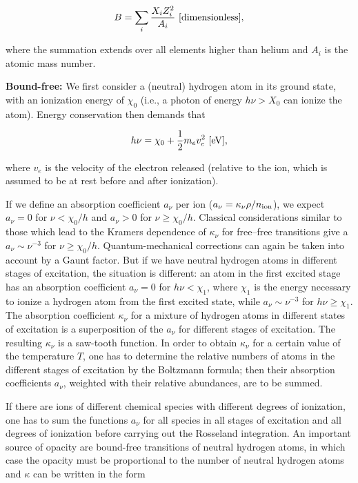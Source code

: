 \documentclass[a4paper,10pt]{article}
\begin{document}
\begin{align*}
    B = \sum_i \frac{X_iZ_i^2}{A_i} ~ [{\rm dimensionless}],
\end{align*}

{\noindent}where the summation extends over all elements higher than helium and $A_i$ is the atomic mass number.

{\noindent}\textbf{Bound-free:} We first consider a (neutral) hydrogen atom in its ground state, with an ionization energy of $\chi_0$ (i.e., a photon of energy $h\nu>X_0$ can ionize the atom). Energy conservation then demands that 

\begin{align*}
    h\nu = \chi_0 + \frac{1}{2}m_ev_e^2 ~ [{\rm eV}],
\end{align*}

{\noindent}where $v_e$ is the velocity of the electron released (relative to the ion, which is assumed to be at rest before and after ionization). 

{\noindent}If we define an absorption coefficient $a_\nu$ per ion ($a_\nu=\kappa_\nu\rho/n_{\rm ion}$), we expect $a_\nu=0$ for $\nu<\chi_0/h$ and $a_\nu>0$ for $\nu\geq\chi_0/h$. Classical considerations similar to those which lead to the Kramers dependence of $\kappa_\nu$ for free–free transitions give a $a_\nu\sim\nu^{-3}$ for $\nu\geq\chi_0/h$. Quantum-mechanical corrections can again be taken into account by a Gaunt factor. But if we have neutral hydrogen atoms in different stages of excitation, the situation is different: an atom in the first excited stage has an absorption coefficient $a_\nu=0$ for $h\nu<\chi_1$, where $\chi_1$ is the energy necessary to ionize a hydrogen atom from the first excited state, while $a_\nu\sim\nu^{-3}$ for $h\nu\geq\chi_1$. The absorption coefficient $\kappa_\nu$ for a mixture of hydrogen atoms in different states of excitation is a superposition of the $a_\nu$ for different stages of excitation. The resulting $\kappa_\nu$ is a saw-tooth function. In order to obtain $\kappa_\nu$ for a certain value of the temperature $T$, one has to determine the relative numbers of atoms in the different stages of excitation by the Boltzmann formula; then their absorption coefficients $a_\nu$, weighted with their relative abundances, are to be summed.

{\noindent}If there are ions of different chemical species with different degrees of ionization, one has to sum the functions $a_\nu$ for all species in all stages of excitation and all degrees of ionization before carrying out the Rosseland integration. An important source of opacity are bound-free transitions of neutral hydrogen atoms, in which case the opacity must be proportional to the number of neutral hydrogen atoms and $\kappa$ can be written in the form
\end{document}
